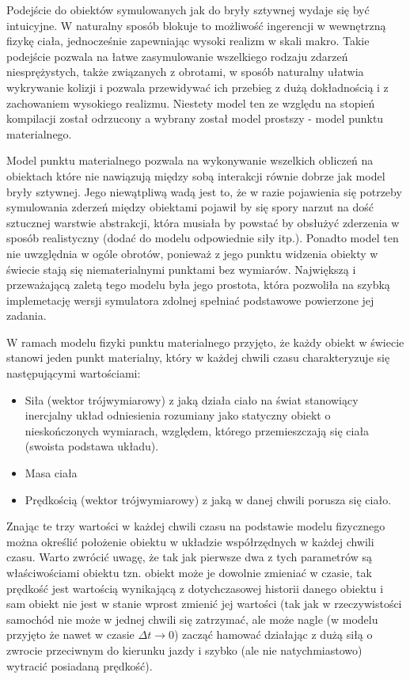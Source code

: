 \par{
Podejście do obiektów symulowanych jak do bryły sztywnej wydaje się być intuicyjne. W naturalny sposób blokuje to możliwość ingerencji w wewnętrzną fizykę ciała, jednocześnie zapewniając wysoki realizm w skali makro.
Takie podejście pozwala na łatwe zasymulowanie wszelkiego rodzaju zdarzeń niesprężystych, także związanych z obrotami, w sposób naturalny ułatwia wykrywanie kolizji i pozwala przewidywać ich przebieg z dużą dokładnością i z zachowaniem wysokiego realizmu.
Niestety model ten ze względu na stopień kompilacji został odrzucony a wybrany został model prostszy - model punktu materialnego.
\par{
Model punktu materialnego pozwala na wykonywanie wszelkich obliczeń na obiektach które nie nawiązują między sobą interakcji równie dobrze jak model bryły sztywnej. Jego niewątpliwą wadą jest to, że w razie pojawienia się potrzeby symulowania zderzeń między obiektami pojawił by się spory narzut na dość sztucznej warstwie abstrakcji, która musiała by powstać by obsłużyć zderzenia w sposób realistyczny (dodać do modelu odpowiednie siły itp.).
Ponadto model ten nie uwzględnia w ogóle obrotów, ponieważ z jego punktu widzenia obiekty w świecie stają się niematerialnymi punktami bez wymiarów.
Największą i przeważającą zaletą tego modelu była jego prostota, która pozwoliła na szybką implemetację wersji symulatora zdolnej spełniać podstawowe powierzone jej zadania. 
}
\par{
W ramach modelu fizyki punktu materialnego przyjęto, że każdy obiekt w świecie stanowi jeden punkt materialny, który w każdej chwili czasu charakteryzuje się następującymi wartościami:
\begin{itemize}
\item Siła (wektor trójwymiarowy) z jaką działa ciało na świat stanowiący inercjalny układ odniesienia rozumiany jako statyczny obiekt o nieskończonych wymiarach, względem, którego przemieszczają się ciała (swoista podstawa układu).
\item Masa ciała
\item Prędkością (wektor trójwymiarowy) z jaką w danej chwili porusza się ciało.
\end{itemize}
Znając te trzy wartości w każdej chwili czasu na podstawie modelu fizycznego można określić położenie obiektu w układzie współrzędnych w każdej chwili czasu.
Warto zwrócić uwagę, że tak jak pierwsze dwa z tych parametrów są właściwościami obiektu tzn. obiekt może je dowolnie zmieniać w czasie, tak prędkość jest wartością wynikającą z dotychczasowej historii danego obiektu i sam obiekt nie jest w stanie wprost zmienić jej wartości (tak jak w rzeczywistości samochód nie może w jednej chwili się zatrzymać, ale może nagle (w modelu przyjęto że nawet w czasie $\Delta t \longrightarrow 0$) zacząć hamować działając z dużą siłą o zwrocie przeciwnym do kierunku jazdy i szybko (ale nie natychmiastowo) wytracić posiadaną prędkość).
}

}

